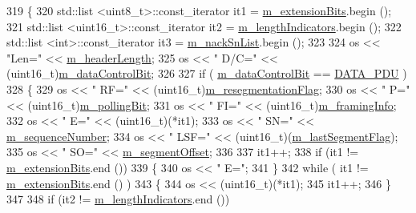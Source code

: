 \begin{DoxyCode}
319 \{
320   std::list <uint8\_t>::const\_iterator it1 = \hyperlink{classns3_1_1LteRlcAmHeader_a74d6d748a89f21632a351e02adb7c0ad}{m\_extensionBits}.begin ();
321   std::list <uint16\_t>::const\_iterator it2 = \hyperlink{classns3_1_1LteRlcAmHeader_af844efce56d400df7aa9224c4df37f84}{m\_lengthIndicators}.begin ();
322   std::list <int>::const\_iterator it3 = \hyperlink{classns3_1_1LteRlcAmHeader_ae9feb3d09099ed90ed014d3f0fa8591b}{m\_nackSnList}.begin ();
323 
324   os << \textcolor{stringliteral}{"Len="} << \hyperlink{classns3_1_1LteRlcAmHeader_a3c565f3b6b45d813ea11f05118898fe8}{m\_headerLength};
325   os << \textcolor{stringliteral}{" D/C="} << (uint16\_t)\hyperlink{classns3_1_1LteRlcAmHeader_a6931b700f09fba1fd4249b027b6bf5ee}{m\_dataControlBit};
326 
327   \textcolor{keywordflow}{if} ( \hyperlink{classns3_1_1LteRlcAmHeader_a6931b700f09fba1fd4249b027b6bf5ee}{m\_dataControlBit} == \hyperlink{classns3_1_1LteRlcAmHeader_a7ccc7b1df0021a5e891e02380cd82cd6a42c82aab6e185dae47e6abd252fe75d2}{DATA\_PDU} )
328     \{
329       os << \textcolor{stringliteral}{" RF="} << (uint16\_t)\hyperlink{classns3_1_1LteRlcAmHeader_acc84b28a7fb612bd28d1fd4a1646a5ea}{m\_resegmentationFlag};
330       os << \textcolor{stringliteral}{" P="} << (uint16\_t)\hyperlink{classns3_1_1LteRlcAmHeader_ae03d21acce0c756a826079ad9bbd88d6}{m\_pollingBit};
331       os << \textcolor{stringliteral}{" FI="} << (uint16\_t)\hyperlink{classns3_1_1LteRlcAmHeader_ac85a4d100aba414b051cc090b9399c46}{m\_framingInfo};
332       os << \textcolor{stringliteral}{" E="} << (uint16\_t)(*it1);
333       os << \textcolor{stringliteral}{" SN="} << \hyperlink{classns3_1_1LteRlcAmHeader_a524ef81f1d7f15e1b19f6487c1d11921}{m\_sequenceNumber};
334       os << \textcolor{stringliteral}{" LSF="} << (uint16\_t)(\hyperlink{classns3_1_1LteRlcAmHeader_ae4480cd1d8b06c31c99bdda06c1ebdd7}{m\_lastSegmentFlag});
335       os << \textcolor{stringliteral}{" SO="} << \hyperlink{classns3_1_1LteRlcAmHeader_aaab2313fbca4a24854b05767219216f4}{m\_segmentOffset};
336 
337       it1++;
338       \textcolor{keywordflow}{if} (it1 != \hyperlink{classns3_1_1LteRlcAmHeader_a74d6d748a89f21632a351e02adb7c0ad}{m\_extensionBits}.end ())
339         \{
340           os << \textcolor{stringliteral}{" E="};
341         \}
342       \textcolor{keywordflow}{while} ( it1 != \hyperlink{classns3_1_1LteRlcAmHeader_a74d6d748a89f21632a351e02adb7c0ad}{m\_extensionBits}.end () )
343         \{
344           os << (uint16\_t)(*it1);
345           it1++;
346         \}
347 
348       \textcolor{keywordflow}{if} (it2 != \hyperlink{classns3_1_1LteRlcAmHeader_af844efce56d400df7aa9224c4df37f84}{m\_lengthIndicators}.end ())

\end{DoxyCode}
